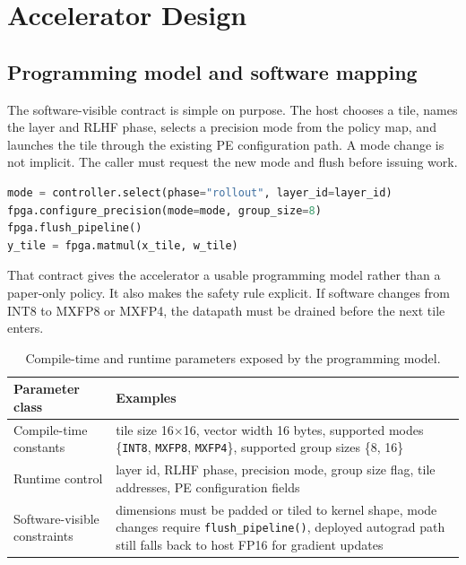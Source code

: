 \documentclass[11pt,a4paper]{article}
\begin{document}
\section{Accelerator Design}

\subsection{Programming model and software mapping}

The software-visible contract is simple on purpose. The host chooses a tile, names the layer and RLHF phase, selects a precision mode from the policy map, and launches the tile through the existing PE configuration path. A mode change is not implicit. The caller must request the new mode and flush before issuing work.

\begin{lstlisting}[language=Python, caption={Host-side targeting model for one tiled linear op.}, label={lst:api}]
mode = controller.select(phase="rollout", layer_id=layer_id)
fpga.configure_precision(mode=mode, group_size=8)
fpga.flush_pipeline()
y_tile = fpga.matmul(x_tile, w_tile)
\end{lstlisting}

That contract gives the accelerator a usable programming model rather than a paper-only policy. It also makes the safety rule explicit. If software changes from INT8 to MXFP8 or MXFP4, the datapath must be drained before the next tile enters.

\begin{table}[h!]
\centering
\small
\begin{tabular}{L{3.4cm}L{8.3cm}}
\toprule
\textbf{Parameter class} & \textbf{Examples} \\
\midrule
Compile-time constants & tile size 16\(\times\)16, vector width 16 bytes, supported modes \{\texttt{INT8}, \texttt{MXFP8}, \texttt{MXFP4}\}, supported group sizes \{8, 16\} \\
Runtime control & layer id, RLHF phase, precision mode, group size flag, tile addresses, PE configuration fields \\
Software-visible constraints & dimensions must be padded or tiled to kernel shape, mode changes require \texttt{flush\_pipeline()}, deployed autograd path still falls back to host FP16 for gradient updates \\
\bottomrule
\end{tabular}
\caption{Compile-time and runtime parameters exposed by the programming model.}
\label{tab:programming-model}
\end{table}
\end{document}
